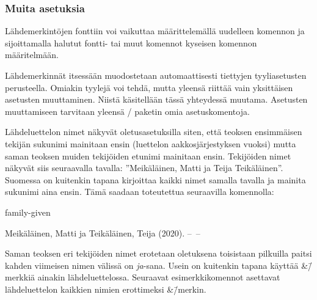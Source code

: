 \begin{koodilohkosis}
\setlength{\bibitemsep}{.5ex plus .1ex minus .1ex}
\setlength{\bibnamesep}{1em  plus .2ex minus .1ex}
\setlength{\bibinitsep}{2em  plus .2ex minus .1ex}
\end{koodilohkosis}

\subsubsection{Muita asetuksia}

Lähdemerkintöjen fonttiin voi vaikuttaa määrittelemällä uudelleen
komennon  ja sijoittamalla halutut fontti- tai muut
komennot kyseisen komennon määritelmään.

\begin{koodilohkosis}
\renewcommand{\bibfont}{\sffamily\small}
\end{koodilohkosis}

Lähdemerkinnät itsessään muodostetaan automaattisesti tiettyjen
tyyliasetusten perusteella. Omiakin tyylejä voi tehdä, mutta yleensä
riittää vain yksittäisen asetusten muuttaminen. Niistä käsitellään tässä
yhteydessä muutama. Asetusten muuttamiseen tarvitaan yleensä
\-/ paketin omia asetuskomentoja.

Lähdeluettelon nimet näkyvät oletusasetuksilla siten, että teoksen
ensimmäisen tekijän sukunimi mainitaan ensin (luettelon
aakkosjärjestyksen vuoksi) mutta saman teoksen muiden tekijöiden etunimi
mainitaan ensin. Tekijöiden nimet näkyvät siis seuraavalla tavalla:
''Meikäläinen, Matti ja Teija Teikäläinen''. Suomessa on kuitenkin
tapana kirjoittaa kaikki nimet samalla tavalla ja mainita sukunimi aina
ensin. Tämä saadaan toteutettua seuraavilla komennolla:

\begin{koodilohkosis}
 {family-given}
\end{koodilohkosis}

\begin{tulossis}
  Meikäläinen, Matti ja Teikäläinen, Teija (2020). --~--
\end{tulossis}

Saman teoksen eri tekijöiden nimet erotetaan oletuksena toisistaan
pilkuilla paitsi kahden viimeisen nimen välissä on \textit{ja}-sana.
Usein on kuitenkin tapana käyttää \&\=/merkkiä ainakin lähdeluettelossa.
Seuraavat esimerkkikomennot asettavat lähdeluettelon kaikkien nimien
erottimeksi \&\=/merkin.

